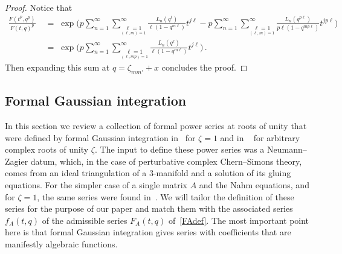 \documentclass[12pt,reqno]{amsart}
\theoremstyle{definition}
\def\be{\begin{equation}}
\def\ee{\end{equation}}
\def\z{\zeta}
\def\={\;=\;}
\def\Phitof{f}
\begin{document}
\begin{proof}
Notice that
\be
\begin{aligned}
\frac{F(t^p,q^p)}{F(t,q)^p}
&\=
\exp\Big(p\sum_{n=1}^{\infty}
\sum_{\underset{(\ell,m)=1}{\ell=1}}^{\infty}
\frac{L_{n}(q^{\ell})}{\ell(1-q^{m\ell})}
t^{j\ell}
-
p\sum_{n=1}^{\infty}
\sum_{\underset{(\ell,m)=1}{\ell=1}}^{\infty}
\frac{L_{n}(q^{p\ell})}{p\ell(1-q^{mp\ell})}
t^{jp\ell}\Big)\\
&\=
\exp\Big(p\sum_{n=1}^{\infty}
\sum_{\underset{(\ell,mp)=1}{\ell=1}}^{\infty}
\frac{L_{n}(q^{\ell})}{\ell(1-q^{m\ell})}
t^{j\ell}\Big)\,.
\end{aligned}
\ee
Then expanding this sum at $q=\z_{mm'}+x$ concludes the proof.
\end{proof}

\subsection{Formal Gaussian integration}
\label{sub.FGI}

In this section we review a collection of formal power series at roots of unity
that were defined by formal Gaussian integration in~\cite{DG} for $\z=1$ and in
~\cite{DG2} for arbitrary complex roots of unity $\z$. The input to define these
power series was a Neumann--Zagier datum, which, in the case of perturbative complex
Chern--Simons theory, comes from an ideal triangulation of a 3-manifold and a solution
of its gluing equations.
For the simpler case of a single matrix $A$ and the Nahm equations, and for
$\zeta=1$, the same series were found in~\cite{Zagier:dilog}.
We will tailor the definition of
these series for the purpose of our paper and match them with the associated series
$\Phitof_A(t,q)$ of the admissible series $F_A(t,q)$ of~\eqref{FAdef}. The most
important point here is that formal Gaussian integration gives series with
coefficients that are manifestly algebraic functions.
\end{document}
